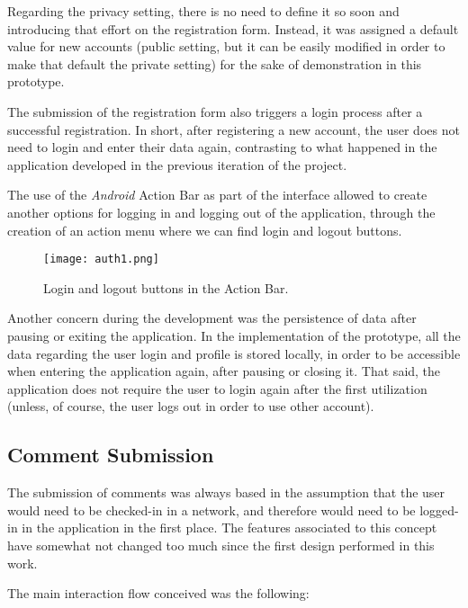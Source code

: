 Regarding the privacy setting, there is no need to define it so soon and introducing that effort on the registration form. Instead, it was assigned a default value for new accounts (public setting, but it can be easily modified in order to make that default the private setting) for the sake of demonstration in this prototype.

The submission of the registration form also triggers a login process after a successful registration. In short, after registering a new account, the user does not need to login and enter their data again, contrasting to what happened in the application developed in the previous iteration of the project.

The use of the \emph{Android} Action Bar as part of the interface allowed to create another options for logging in and logging out of the application, through the creation of an action menu where we can find login and logout buttons.

\begin{figure}[h!]
  \begin{center}
    \leavevmode
    \texttt{[image: auth1.png]}
    \caption{Login and logout buttons in the Action Bar.}
    \label{fig:auth3}
  \end{center}
\end{figure}

Another concern during the development was the persistence of data after pausing or exiting the application. In the implementation of the prototype, all the data regarding the user login and profile is stored locally, in order to be accessible when entering the application again, after pausing or closing it. That said, the application does not require the user to login again after the first utilization (unless, of course, the user logs out in order to use other account).

\newpage

\subsection{Comment Submission}\label{comment}

The submission of comments was always based in the assumption that the user would need to be checked-in in a network, and therefore would need to be logged-in in the application in the first place. 
The features associated to this concept have somewhat not changed too much since the first design performed in this work.

The main interaction flow conceived was the following:

